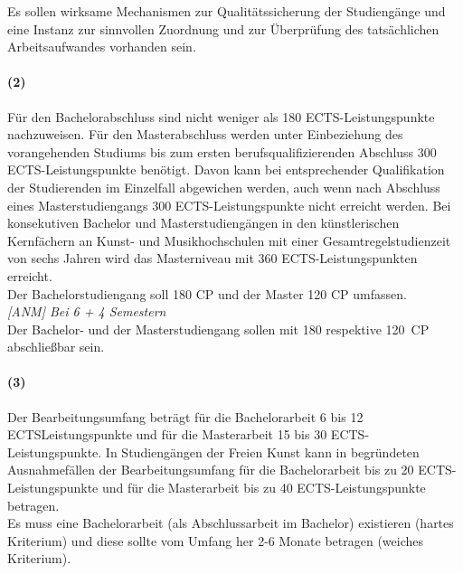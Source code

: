 \documentclass[a4paper]{scrartcl}
\begin{document}
\textcolor{Bernd}{\textbf{\cite{RESO: SoSe2010-BaMa}} Es sollen wirksame Mechanismen zur Qualitätssicherung der Studiengänge und eine Instanz zur sinnvollen Zuordnung und zur Überprüfung des tatsächlichen Arbeitsaufwandes vorhanden sein.}

\paragraph{(2)}
Für den Bachelorabschluss sind nicht weniger als 180 ECTS-Leistungspunkte nachzuweisen. Für den Masterabschluss werden unter Einbeziehung des vorangehenden Studiums bis zum ersten berufsqualifizierenden Abschluss 300 ECTS-Leistungspunkte benötigt. Davon kann bei entsprechender Qualifikation der Studierenden im Einzelfall abgewichen werden, auch wenn nach Abschluss eines Masterstudiengangs 300 ECTS-Leistungspunkte nicht erreicht werden. Bei konsekutiven Bachelor und Masterstudiengängen in den künstlerischen Kernfächern an Kunst- und Musikhochschulen mit einer Gesamtregelstudienzeit von sechs Jahren wird das Masterniveau mit 360 ECTS-Leistungspunkten erreicht.\\

\textcolor{Bernd}{\textbf{\cite{RESO: SoSe2002-RL}} Der Bachelorstudiengang soll 180 CP und der Master 120 CP umfassen.}\\

\textcolor{Brutus}{\emph{[ANM] Bei 6 + 4 Semestern }}\\

\textcolor{Bernd}{\textbf{\cite{RESO: SoSe2010-BaMa}} Der Bachelor- und der Masterstudiengang sollen mit 180 respektive 120~CP abschließbar sein.}


\paragraph{(3)} Der Bearbeitungsumfang beträgt für die Bachelorarbeit 6 bis 12 ECTSLeistungspunkte und für die Masterarbeit 15 bis 30 ECTS-Leistungspunkte. In Studiengängen der Freien Kunst kann in begründeten Ausnahmefällen der Bearbeitungsumfang für die Bachelorarbeit bis zu 20 ECTS-Leistungspunkte und für die Masterarbeit bis zu 40 ECTS-Leistungspunkte betragen.\\

\textcolor{Bernd}{\textbf{\cite{RESO: SoSe2002-RL}} Es muss eine Bachelorarbeit (als Abschlussarbeit im Bachelor) existieren (hartes Kriterium) und diese sollte vom Umfang her 2-6 Monate betragen (weiches Kriterium).}\\ %
\end{document}

